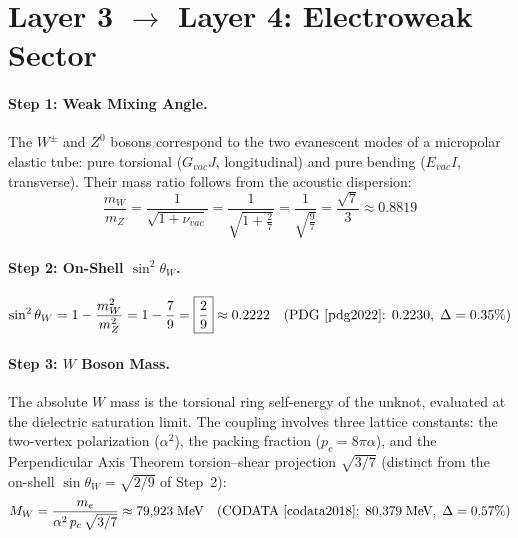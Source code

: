 \section{Layer 3 $\to$ Layer 4: Electroweak Sector}
\label{sec:layer34}

\paragraph{Step 1: Weak Mixing Angle.}
The $W^{\pm}$ and $Z^0$ bosons correspond to the two evanescent modes of a
micropolar elastic tube: pure torsional ($G_{vac}J$, longitudinal) and
pure bending ($E_{vac}I$, transverse). Their mass ratio follows from the
acoustic dispersion:
\begin{equation}
    \frac{m_W}{m_Z}
    = \frac{1}{\sqrt{1 + \nu_{vac}}}
    = \frac{1}{\sqrt{1 + \frac{2}{7}}}
    = \frac{1}{\sqrt{\frac{9}{7}}}
    = \boxed{\frac{\sqrt{7}}{3}}
    \approx 0.8819
    \label{eq:weak_mixing}
\end{equation}

\paragraph{Step 2: On-Shell $\sin^{2}\theta_{W}$.}
\begin{equation}
    \sin^2\theta_W
    = 1 - \frac{m_W^2}{m_Z^2}
    = 1 - \frac{7}{9}
    = \boxed{\frac{2}{9}}
    \approx 0.2222
    \quad\text{(PDG~\cite{pdg2022}: } 0.2230,\; \Delta = 0.35\%\text{)}
    \label{eq:sin2tw}
\end{equation}

\paragraph{Step 3: $W$ Boson Mass.}
The absolute $W$ mass is the torsional ring self-energy of the unknot,
evaluated at the dielectric saturation limit. The coupling involves three
lattice constants: the two-vertex polarization ($\alpha^2$), the packing
fraction ($p_c = 8\pi\alpha$), and the Perpendicular Axis Theorem
torsion--shear projection $\sqrt{3/7}$ (distinct from the on-shell
$\sin\theta_W = \sqrt{2/9}$ of Step~2):
\begin{equation}
    M_W = \frac{m_e}{\alpha^2\,p_c\,\sqrt{3/7}}
    \approx 79{,}923\;\text{MeV}
    \quad\text{(CODATA~\cite{codata2018}: } 80{,}379\;\text{MeV},\; \Delta = 0.57\%\text{)}
    \label{eq:MW}
\end{equation}

